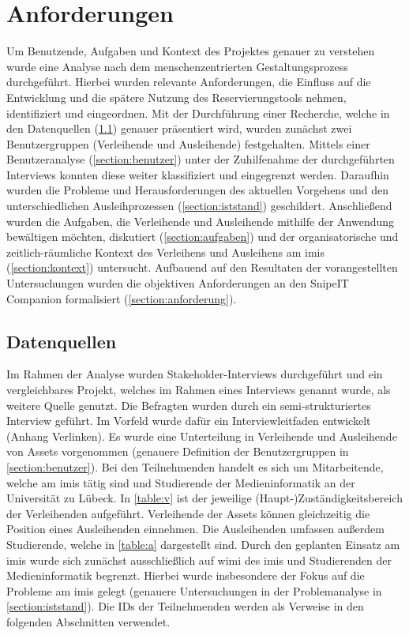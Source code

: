 
\chapter{Anforderungen}
\label{chapter-analyse}

Um Benutzende, Aufgaben und Kontext des Projektes genauer zu verstehen wurde eine Analyse nach dem
menschenzentrierten Gestaltungsprozess durchgeführt. Hierbei wurden relevante Anforderungen, die
Einfluss auf die Entwicklung und die spätere Nutzung des Reservierungstools nehmen, identifiziert
und eingeordnen. Mit der Durchführung einer Recherche, welche in den Datenquellen
(\ref{section:daten}) genauer präsentiert wird, wurden zunächst zwei Benutzergruppen (Verleihende
und Ausleihende) festgehalten. Mittels einer Benutzeranalyse (\ref{section:benutzer}) unter der
Zuhilfenahme der durchgeführten Interviews konnten diese weiter klassifiziert und eingegrenzt
werden. Daraufhin wurden die Probleme und Herausforderungen des aktuellen Vorgehens und den
unterschiedlichen Ausleihprozessen (\ref{section:iststand}) geschildert. Anschließend wurden die
Aufgaben, die Verleihende und Ausleihende mithilfe der Anwendung bewältigen möchten, diskutiert
(\ref{section:aufgaben}) und der organisatorische und zeitlich-räumliche Kontext des Verleihens und
Ausleihens am \ac{imis} (\ref{section:kontext}) untersucht. Aufbauend auf den Resultaten der
vorangestellten Untersuchungen wurden die objektiven Anforderungen an den SnipeIT Companion
formalisiert (\ref{section:anforderung}).

\section{Datenquellen}
\label{section:daten}
Im Rahmen der Analyse wurden Stakeholder-Interviews durchgeführt und ein vergleichbares Projekt,
welches im Rahmen eines Interviews genannt wurde, als weitere Quelle genutzt. Die Befragten wurden
durch ein semi-strukturiertes Interview geführt. Im Vorfeld wurde dafür ein Interviewleitfaden
entwickelt (Anhang Verlinken). Es wurde eine Unterteilung in Verleihende und Ausleihende von Assets
vorgenommen (genauere Definition der Benutzergruppen in \ref{section:benutzer}). Bei den
Teilnehmenden handelt es sich um Mitarbeitende, welche am \ac{imis} tätig sind und Studierende der
Medieninformatik an der Universität zu Lübeck. In \ref{table:v} ist der jeweilige
(Haupt-)Zuständigkeitsbereich der Verleihenden aufgeführt. Verleihende der Assets können
gleichzeitig die Position eines Ausleihenden einnehmen. Die Ausleihenden umfassen außerdem
Studierende, welche in \ref{table:a} dargestellt sind. Durch den geplanten Einsatz am \ac{imis}
wurde sich zunächst ausschließlich auf \ac{wimi} des \ac{imis} und Studierenden der Medieninformatik
begrenzt. Hierbei wurde insbesondere der Fokus auf die Probleme am \ac*{imis} gelegt (genauere
Untersuchungen in der Problemanalyse in \ref{section:iststand}). Die IDs der Teilnehmenden werden
als Verweise in den folgenden Abschnitten verwendet.

